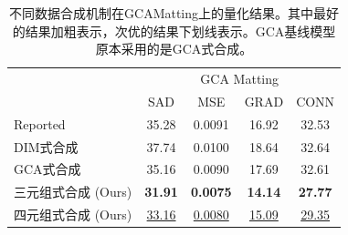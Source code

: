 \documentclass[supercite]{HustGraduPaper}
\begin{document}
	\begin{table}[htbp]
		\setlength{\tabcolsep}{7.2pt}
		\centering
		\caption{不同数据合成机制在GCAMatting上的量化结果。其中最好的结果加粗表示，次优的结果下划线表示。GCA基线模型原本采用的是GCA式合成。}
		\label{tab:styles-GCA}
		\begin{tabular}{@{}lcccc@{}}
		\toprule
		& \multicolumn{4}{c}{GCA Matting} \\
		& SAD    & MSE  & GRAD  & CONN\\
		\midrule
		Reported          & 35.28       & 0.0091       & 16.92      & 32.53    \\
		DIM式合成          &37.74       &0.0100        &18.64       &32.64    \\
		GCA式合成         &35.16 & 0.0090 & 17.69 & 32.61 \\
		三元组式合成  (Ours)    & \textbf{31.91} & \textbf{0.0075} & \textbf{14.14} & \textbf{27.77}  \\
		四元组式合成  (Ours) &\underline{ 33.16} & \underline{0.0080 }& \underline{15.09} & \underline{29.35}\\
		\bottomrule
		\end{tabular}
	\end{table}
\end{document}
